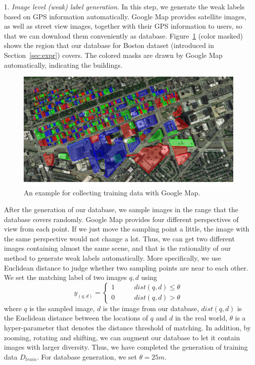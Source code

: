 1.	\emph{Image level (weak) label generation.} 
In this step, we generate the weak labels based on GPS information automatically. 
Google Map provides satellite images, as well as street view images, together with their GPS information to users, so that we can download them conveniently as database. 
Figure~\ref{fig:dbregion} (color masked) shows the region that our database for Boston dataset (introduced in Section~\ref{sec:expr}) covers. 
The colored masks are drawn by Google Map automatically, indicating the buildings. 
\begin{figure}[t]
\includegraphics[width=0.7\linewidth]{img/db_region}
\caption{An example for collecting training data with Google Map.}
\label{fig:dbregion}
\end{figure}
After the generation of our database, we sample images in the range that the database covers randomly. 
Google Map provides four different perspectives of view from each point. 
If we just move the sampling point a little, the image with the same perspective would not change a lot. 
Thus, we can get two different images containing almost the same scene, and that is the rationality of our method to generate weak labels automatically.
More specifically, we use Euclidean distance to judge whether two sampling points are near to each other. 
We set the matching label of two images $q, d$ using 
\small
\begin{equation}
\label{eq:weaklabel}
y_{(q, d)} = \left\{
\begin{aligned}
1 \qquad & dist(q,d) \leq \theta \\
0 \qquad & dist(q,d) > \theta
\end{aligned}
\right.
\end{equation}
\normalsize
where $q$ is the sampled image, $d$ is the image from our database, $dist(q,d)$ is the Euclidean distance between the locations of $q$ and $d$ in the real world, $\theta$ is a hyper-parameter that denotes the distance threshold of matching. 
In addition, by zooming, rotating and shifting, we can augment our database to let it contain images with larger diversity. 
Thus, we have completed the generation of training data $D_{train}$.
For database generation, we set $\theta = 25m$.\\[-0.25cm]

